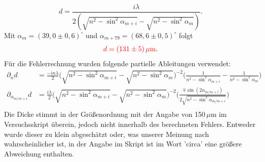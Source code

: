 \begin{equation*}
    d = \frac{i\lambda}{2(\sqrt{n^2-\sin^2\alpha_{m+i}} - \sqrt{n^2-\sin^2\alpha_m})}.
\end{equation*}
Mit $\alpha_m = (39,0 \pm 0,6)^\circ$ und $\alpha_{m+79} = (68,6 \pm 0,5)^\circ$ folgt 
\begin{equation*}
    \textcolor{red}{d = (131 \pm 5)\,\mu\mathrm{m}}.
\end{equation*}
Für die Fehlerrechnung wurden folgende partielle Ableitungen verwendet:
\begin{align*}
    \partial_nd &= \frac{-in\lambda}{2}\big(\sqrt{n^2-\sin^2\alpha_{m+i}}- \sqrt{n^2-\sin^2\alpha_{m}}\big)^{-2}\big(\frac{1}{n^2-\sin^2\alpha_{m+i}} - \frac{1}{n^2-\sin^2\alpha_{m}}\big)\\
    \partial_{\alpha_{m/m+i}}d &= \frac{i\lambda}{2}\big(\sqrt{n^2-\sin^2\alpha_{m+i}}- \sqrt{n^2-\sin^2\alpha_{m}}\big)^{-2}\bigg(\frac{\mp \sin(2\alpha_{m/m+i})}{2\sqrt{n^2-\sin^2\alpha_{m/m+i}}}\bigg)\\
\end{align*}
Die Dicke stimmt in der Größenordnung mit der Angabe von 150\,$\mu$m im Versuchsskript überein, jedoch nicht innerhalb des berechneten Fehlers. Entweder wurde dieser zu klein 
abgeschätzt oder, was unserer Meinung nach wahrscheinlicher ist, in der Angabe im Skript ist im Wort 'circa' eine größere Abweichung enthalten.